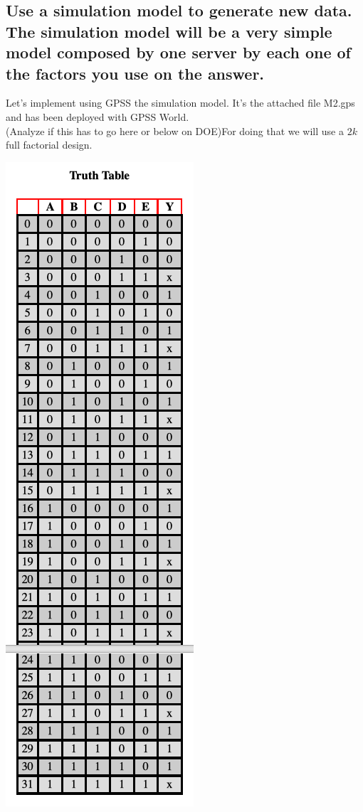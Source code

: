 \documentclass[12pt]{article}
\begin{document}
\subsection {Use a simulation model to generate new data. The simulation model will be a very simple model composed by one server by each one of the factors you use on the answer.}
Let's implement using GPSS the simulation model. It's the attached file M2.gps and has been deployed with GPSS World.\\
(Analyze if this has to go here or below on DOE)For doing that we will use a $2{k}$ full factorial design.\\
\noindent\begin{minipage}{0.3\textwidth}%
  \includegraphics[scale=0.4]{scenariosFullFactor.png}
\end{minipage}%
\end{document}
